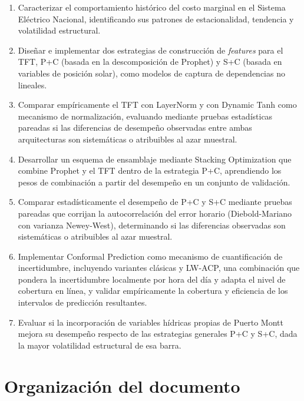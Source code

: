 \begin{enumerate}
    \item Caracterizar el comportamiento histórico del costo marginal en el Sistema Eléctrico Nacional, identificando sus patrones de estacionalidad, tendencia y volatilidad estructural.

    \item Diseñar e implementar dos estrategias de construcción de \textit{features} para el TFT, P+C (basada en la descomposición de Prophet) y S+C (basada en variables de posición solar), como modelos de captura de dependencias no lineales.

    \item Comparar empíricamente el TFT con LayerNorm y con Dynamic Tanh como mecanismo de normalización, evaluando mediante pruebas estadísticas pareadas si las diferencias de desempeño observadas entre ambas arquitecturas son sistemáticas o atribuibles al azar muestral.

    \item Desarrollar un esquema de ensamblaje mediante Stacking Optimization que combine Prophet y el TFT dentro de la estrategia P+C, aprendiendo los pesos de combinación a partir del desempeño en un conjunto de validación.

    \item Comparar estadísticamente el desempeño de P+C y S+C mediante pruebas pareadas que corrijan la autocorrelación del error horario (Diebold-Mariano con varianza Newey-West), determinando si las diferencias observadas son sistemáticas o atribuibles al azar muestral.

    \item Implementar Conformal Prediction como mecanismo de cuantificación de incertidumbre, incluyendo variantes clásicas y LW-ACP, una combinación que pondera la incertidumbre localmente por hora del día y adapta el nivel de cobertura en línea, y validar empíricamente la cobertura y eficiencia de los intervalos de predicción resultantes.

    \item Evaluar si la incorporación de variables hídricas propias de Puerto Montt mejora su desempeño respecto de las estrategias generales P+C y S+C, dada la mayor volatilidad estructural de esa barra.
\end{enumerate}

\section{Organización del documento}

